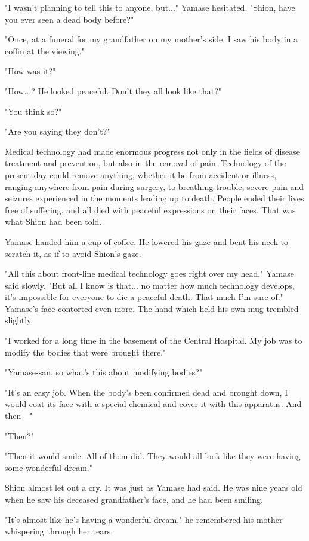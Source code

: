 "I wasn't planning to tell this to anyone, but..." Yamase hesitated.
"Shion, have you ever seen a dead body before?"

"Once, at a funeral for my grandfather on my mother's side. I saw his
body in a coffin at the viewing."

"How was it?"

"How...? He looked peaceful. Don't they all look like that?"

"You think so?"

"Are you saying they don't?"

Medical technology had made enormous progress not only in the fields of
disease treatment and prevention, but also in the removal of pain.
Technology of the present day could remove anything, whether it be from
accident or illness, ranging anywhere from pain during surgery, to
breathing trouble, severe pain and seizures experienced in the moments
leading up to death. People ended their lives free of suffering, and all
died with peaceful expressions on their faces. That was what Shion had
been told.

Yamase handed him a cup of coffee. He lowered his gaze and bent his neck
to scratch it, as if to avoid Shion's gaze.

"All this about front-line medical technology goes right over my head,"
Yamase said slowly. "But all I know is that... no matter how much
technology develops, it's impossible for everyone to die a peaceful
death. That much I'm sure of." Yamase's face contorted even more. The
hand which held his own mug trembled slightly.

"I worked for a long time in the basement of the Central Hospital. My
job was to modify the bodies that were brought there."

"Yamase-san, so what's this about modifying bodies?"

"It's an easy job. When the body's been confirmed dead and brought down,
I would coat its face with a special chemical and cover it with this
apparatus. And then---"

"Then?"

"Then it would smile. All of them did. They would all look like they
were having some wonderful dream."

Shion almost let out a cry. It was just as Yamase had said. He was nine
years old when he saw his deceased grandfather's face, and he had been
smiling.

"It's almost like he's having a wonderful dream," he remembered his
mother whispering through her tears.


